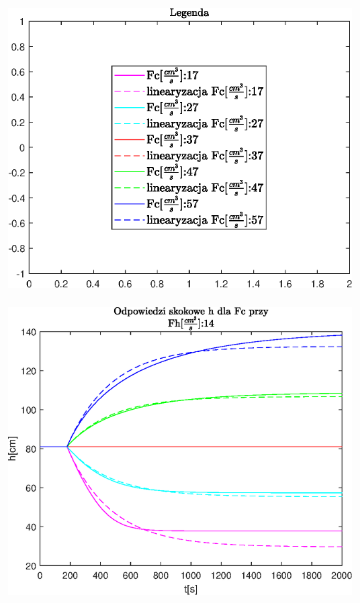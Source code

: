 \begin{figure}[h!]
   \centering
   \begin{subfigure}[b]{0.6\textwidth}
      \includegraphics[width=1\linewidth]{img/step-responses-fc/legendFc.eps}
      \caption{}
      \label{fig:fig:stepResponsesFc141}
   \end{subfigure}
       
   \begin{subfigure}[b]{0.6\textwidth}
      \includegraphics[width=1\linewidth]{img/step-responses-fc/stepResponseHFc.eps}
      \caption{}
      \label{fig:fig:stepResponsesFc142}
   \end{subfigure}
       

\end{figure}
